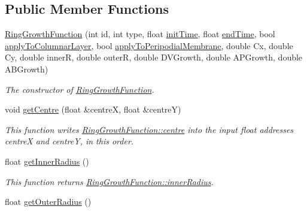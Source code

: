 \subsection*{Public Member Functions}
\begin{DoxyCompactItemize}
\item 
\hyperlink{classRingGrowthFunction_a7b8c3ed24ac7246be8817d1bcbc12289}{Ring\+Growth\+Function} (int id, int type, float \hyperlink{classGrowthFunctionBase_ae92513a7b41637df8e26e7db35ddf97c}{init\+Time}, float \hyperlink{classGrowthFunctionBase_a3ff4db0573d354a75666a5f3ca446941}{end\+Time}, bool \hyperlink{classGrowthFunctionBase_a3d56771e7c145589a14e11cc331e0326}{apply\+To\+Columnar\+Layer}, bool \hyperlink{classGrowthFunctionBase_a08ae19f58cb98fa8e315a77f52749732}{apply\+To\+Peripodial\+Membrane}, double Cx, double Cy, double inner\+R, double outer\+R, double D\+V\+Growth, double A\+P\+Growth, double A\+B\+Growth)
\begin{DoxyCompactList}\small\item\em The constructor of \hyperlink{classRingGrowthFunction}{Ring\+Growth\+Function}. \end{DoxyCompactList}\item 
\hypertarget{classRingGrowthFunction_aa2063170e3ee5c5f22d7beef32300e9c}{}void \hyperlink{classRingGrowthFunction_aa2063170e3ee5c5f22d7beef32300e9c}{get\+Centre} (float \&centre\+X, float \&centre\+Y)\label{classRingGrowthFunction_aa2063170e3ee5c5f22d7beef32300e9c}

\begin{DoxyCompactList}\small\item\em This function writes \hyperlink{classRingGrowthFunction_a5b8f1cc72d03907bb1492e6c2f288db0}{Ring\+Growth\+Function\+::centre} into the input float addresses centre\+X and centre\+Y, in this order. \end{DoxyCompactList}\item 
\hypertarget{classRingGrowthFunction_ae1f4f4cecfab3ec343c748cfe78ab70b}{}float \hyperlink{classRingGrowthFunction_ae1f4f4cecfab3ec343c748cfe78ab70b}{get\+Inner\+Radius} ()\label{classRingGrowthFunction_ae1f4f4cecfab3ec343c748cfe78ab70b}

\begin{DoxyCompactList}\small\item\em This function returns \hyperlink{classRingGrowthFunction_a4e8796fbbbe9fe18c2dcd04613effcf0}{Ring\+Growth\+Function\+::inner\+Radius}. \end{DoxyCompactList}\item 
\hypertarget{classRingGrowthFunction_ad5c890c72a8ce520411d28e929faec19}{}float \hyperlink{classRingGrowthFunction_ad5c890c72a8ce520411d28e929faec19}{get\+Outer\+Radius} ()\label{classRingGrowthFunction_ad5c890c72a8ce520411d28e929faec19}


\end{DoxyCompactItemize}
